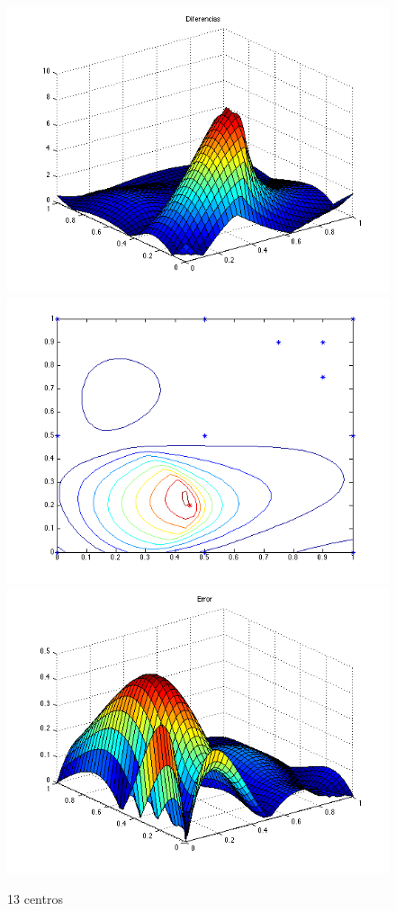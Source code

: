 \documentclass[11pt,a4paper]{article}
\begin{document}
\begin{figure}[H]
\centering

\includegraphics[scale=0.35]{diferencias13.png}
\includegraphics[scale=0.35]{centros13.png}
\includegraphics[scale=0.35]{error13.png}
\caption{13 centros}
\end{figure}
\end{document}
